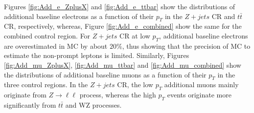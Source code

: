 Figures \ref{fig:Add_e_ZplusX} and \ref{fig:Add_e_ttbar} show the distributions of additional baseline electrons as a function of their $p_{T}$ in the $Z+jets$ CR and $t\bar{t}$ CR, respectively, whereas, Figure \ref{fig:Add_e_combined} show the same for the combined control region. For $Z+jets$ CR at low $p_{T}$, additional baseline electrons are overestimated in MC by about $20\%$, thus showing that the precision of MC to estimate the non-prompt leptons is limited. Similarly, Figures \ref{fig:Add_mu_ZplusX}, \ref{fig:Add_mu_ttbar} and \ref{fig:Add_mu_combined} show the distributions of additional baseline muons as a function of their $p_{T}$ in the three control regions. In the $Z+jets$ CR, the low $p_{T}$ additional muons mainly originate from $Z\rightarrow \ell \ell$ process, whereas the high $p_{T}$ events originate more significantly from $t\bar{t}$ and WZ processes.


